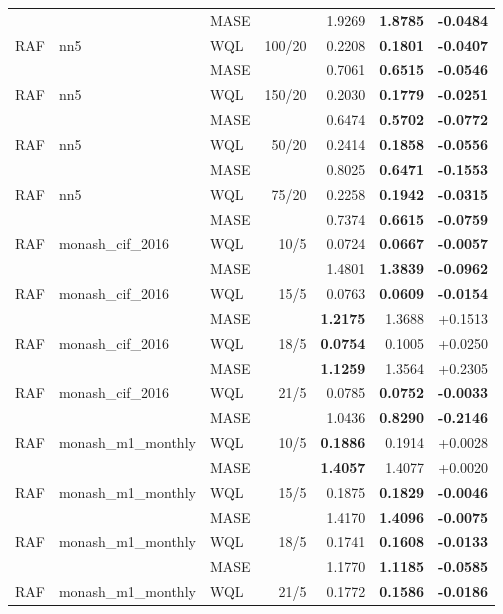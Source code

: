 \begin{longtable}{@{}lllrrrr@{}}
 &  & MASE &  & 1.9269 & \textbf{1.8785} & \textbf{-0.0484} \\
RAF & nn5 & WQL & 100/20 & 0.2208 & \textbf{0.1801} & \textbf{-0.0407} \\
 &  & MASE &  & 0.7061 & \textbf{0.6515} & \textbf{-0.0546} \\
RAF & nn5 & WQL & 150/20 & 0.2030 & \textbf{0.1779} & \textbf{-0.0251} \\
 &  & MASE &  & 0.6474 & \textbf{0.5702} & \textbf{-0.0772} \\
RAF & nn5 & WQL & 50/20 & 0.2414 & \textbf{0.1858} & \textbf{-0.0556} \\
 &  & MASE &  & 0.8025 & \textbf{0.6471} & \textbf{-0.1553} \\
RAF & nn5 & WQL & 75/20 & 0.2258 & \textbf{0.1942} & \textbf{-0.0315} \\
 &  & MASE &  & 0.7374 & \textbf{0.6615} & \textbf{-0.0759} \\
RAF & monash\_cif\_2016 & WQL & 10/5 & 0.0724 & \textbf{0.0667} & \textbf{-0.0057} \\
 &  & MASE &  & 1.4801 & \textbf{1.3839} & \textbf{-0.0962} \\
RAF & monash\_cif\_2016 & WQL & 15/5 & 0.0763 & \textbf{0.0609} & \textbf{-0.0154} \\
 &  & MASE &  & \textbf{1.2175} & 1.3688 & +0.1513 \\
RAF & monash\_cif\_2016 & WQL & 18/5 & \textbf{0.0754} & 0.1005 & +0.0250 \\
 &  & MASE &  & \textbf{1.1259} & 1.3564 & +0.2305 \\
RAF & monash\_cif\_2016 & WQL & 21/5 & 0.0785 & \textbf{0.0752} & \textbf{-0.0033} \\
 &  & MASE &  & 1.0436 & \textbf{0.8290} & \textbf{-0.2146} \\
RAF & monash\_m1\_monthly & WQL & 10/5 & \textbf{0.1886} & 0.1914 & +0.0028 \\
 &  & MASE &  & \textbf{1.4057} & 1.4077 & +0.0020 \\
RAF & monash\_m1\_monthly & WQL & 15/5 & 0.1875 & \textbf{0.1829} & \textbf{-0.0046} \\
 &  & MASE &  & 1.4170 & \textbf{1.4096} & \textbf{-0.0075} \\
RAF & monash\_m1\_monthly & WQL & 18/5 & 0.1741 & \textbf{0.1608} & \textbf{-0.0133} \\
 &  & MASE &  & 1.1770 & \textbf{1.1185} & \textbf{-0.0585} \\
RAF & monash\_m1\_monthly & WQL & 21/5 & 0.1772 & \textbf{0.1586} & \textbf{-0.0186} \\

\end{longtable}
